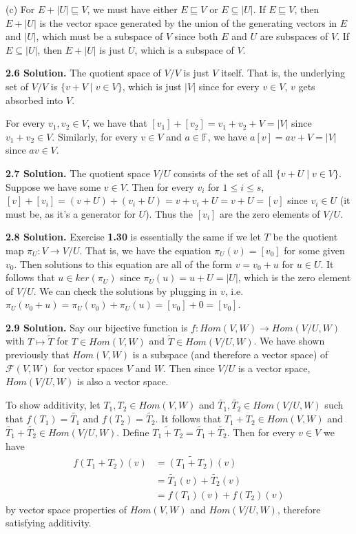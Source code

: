 (c) For $E+|U|\sqsubseteq V$, we must have either $E\sqsubseteq V$ or $E\subseteq |U|$. If $E\sqsubseteq V$, then $E+|U|$ is the vector space generated by the union of the generating vectors in $E$ and $|U|$, which must be a subspace of $V$ since both $E$ and $U$ are subspaces of $V$. If $E\subseteq |U|$, then $E+|U|$ is just $U$, which is a subspace of $V$.

\textbf{2.6 Solution.} The quotient space of $V/V$ is just $V$ itself. That is, the underlying set of $V/V$ is $\{v+V\mid v\in V\}$, which is just $|V|$ since for every $v\in V$, $v$ gets absorbed into $V$.

For every $v_1,v_2\in V$, we have that $[v_1]+[v_2]=v_1+v_2+V=|V|$ since $v_1+v_2\in V$. Similarly, for every $v\in V$ and $a\in\mathbb{F}$, we have $a[v]=av+V=|V|$ since $av\in V$.

\textbf{2.7 Solution.} The quotient space $V/U$ consists of the set of all $\{v+U\mid v\in V\}$. Suppose we have some $v\in V$. Then for every $v_i$ for $1\leq i\leq s$, $[v]+[v_i] = (v+U)+(v_i+U) = v+v_i+U = v + U = [v]$ since $v_i\in U$ (it must be, as it's a generator for $U$). Thus the $[v_i]$ are the zero elements of $V/U$.

\textbf{2.8 Solution.} Exercise \textbf{1.30} is essentially the same if we let $T$ be the quotient map $\pi_U:V\to V/U$. That is, we have the equation $\pi_U(v) = [v_0]$ for some given $v_0$. Then solutions to this equation are all of the form $v=v_0+u$ for $u\in U$. It follows that $u\in ker(\pi_U)$ since $\pi_U(u) = u+U = |U|$, which is the zero element of $V/U$. We can check the solutions by plugging in $v$, i.e. $\pi_U(v_0+u) = \pi_U(v_0)+\pi_U(u) = [v_0] + 0 = [v_0]$.

\textbf{2.9 Solution.} Say our bijective function is $f:Hom(V,W)\to Hom(V/U,W)$ with $T\mapsto\widetilde{T}$ for $T\in Hom(V,W)$ and $\widetilde{T}\in Hom(V/U,W)$. We have shown previously that $Hom(V,W)$ is a subspace (and therefore a vector space) of $\mathcal{F}(V,W)$ for vector spaces $V$ and $W$. Then since $V/U$ is a vector space, $Hom(V/U,W)$ is also a vector space.

To show additivity, let $T_1,T_2\in Hom(V,W)$ and $\widetilde{T_1},\widetilde{T_2}\in Hom(V/U,W)$ such that $f(T_1)=\widetilde{T_1}$ and $f(T_2)=\widetilde{T_2}$. It follows that $T_1+T_2\in Hom(V,W)$ and $\widetilde{T_1}+\widetilde{T_2}\in Hom(V/U,W)$. Define $\widetilde{T_1+T_2} = \widetilde{T_1}+\widetilde{T_2}$. Then for every $v\in V$ we have
\begin{align*}
    f(T_1+T_2)(v) &= \widetilde{(T_1+T_2)}(v) \\
                  &= \widetilde{T_1}(v)+\widetilde{T_2}(v) \\
                  &= f(T_1)(v)+f(T_2)(v)
\end{align*}
by vector space properties of $Hom(V,W)$ and $Hom(V/U,W)$, therefore satisfying additivity.

